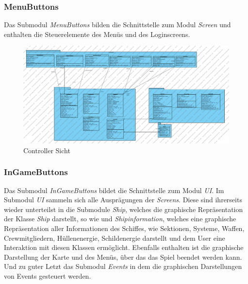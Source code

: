 \documentclass[fontsize=12pt,paper=a4,twoside]{scrartcl}
\begin{document}
\newpage

\subsubsection{MenuButtons}
Das Submodul \textit{MenuButtons} bilden die Schnittstelle zum Modul \textit{Screen} und enthalten die Steuerelemente des Menüs und des Loginscreens.


\begin{figure}[H] 
\begin{center}
 \includegraphics[width=\textwidth]{../GT_Modulsicht/PDFs/View-SubDiagramm_Menue+MenueButtons.pdf}
  \caption{Controller Sicht}
  \label{fig:boat1}
\end{center}
\end{figure}


\subsubsection{InGameButtons}
Das Submodul \textit{InGameButtons} bildet die Schnittstelle zum Modul \textit{UI}. Im Submodul \textit{UI} sammeln sich alle Ausprägungen der \textit{Screens}. Diese sind ihrerseits wieder unterteilst in die Submodule \textit{Ship}, welches die graphische Repräsentation der Klasse \textit{Ship}  darstellt, so wie und \textit{Shipinformation}, welches eine graphische Repräsentation aller Informationen des Schiffes, wie Sektionen, Systeme, Waffen, Crewmitgliedern, Hüllenenergie, Schildenergie darstellt und dem User eine Interaktion mit diesen Klassen ermöglicht.  Ebenfalls enthalten ist die graphische Darstellung der Karte und des Menüs, über das das Spiel beendet werden kann. Und zu guter Letzt das Submodul \textit{Events} in dem die graphischen Darstellungen von Events gesteuert werden. 
\end{document}
